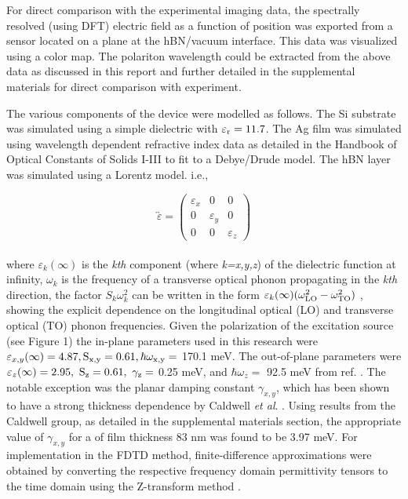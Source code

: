 \documentclass[12pt]{report}
\begin{document}
    For direct comparison with the experimental imaging data, the spectrally resolved (using DFT) electric field as a function of position was exported from a sensor located on a plane at the hBN/vacuum interface. This data was visualized using a color map. The polariton wavelength could be extracted from the above data as discussed in this report and further detailed in the supplemental materials for direct comparison with experiment.

    The various components of the device were modelled as follows. The Si substrate was simulated using a simple dielectric with $\rm \varepsilon_{r}=11.7$. The Ag film was simulated using wavelength dependent refractive index data as detailed in the Handbook of Optical Constants of Solids I-III \cite{Palik:85} to fit to a Debye/Drude model. The hBN layer was simulated using a Lorentz model. i.e.,

          \begin{equation*}
            \overleftrightarrow{\varepsilon} = \begin{pmatrix} \varepsilon_{x}&0&0\\
                                          0&\varepsilon_{y}&0\\
                                          0&0&\varepsilon_{z}\end{pmatrix}
          \end{equation*}
          \\

    where $\varepsilon_{k}(\infty)$ is the \textit{kth} component (where \textit{k=x,y,z}) of the dielectric function at infinity, $\omega_{k} $ is the frequency of a transverse optical phonon propagating in the \textit{kth} direction, the factor $S_{k} \omega_{k}^{2} $ can be written in the form $\varepsilon_{k}(\infty)(\omega_{\rm{LO}}^{2} - \omega_{\rm{TO}}^{2}) $  \cite{Kumar:15}, showing the explicit dependence on the longitudinal optical (LO) and transverse optical (TO) phonon frequencies. Given the polarization of the excitation source (see Figure 1) the in-plane parameters used in this research were $\varepsilon_{x,y}(\infty)= \rm{4.87}, S_{x,y} = \rm{0.61}, \hbar \omega_{x,y} = $ 170.1 meV. The out-of-plane parameters were  $\varepsilon_{z}(\infty)= \rm{2.95}, \ S_{z} = \rm{0.61}, \ \gamma_{z} = $ 0.25 meV, and $\hbar \omega_{z} = $ 92.5 meV from ref. \cite{Jiang:18}. The notable exception was the planar damping constant $\gamma_{x,y} $, which has been shown to have a strong thickness dependence by Caldwell \textit{et al}. \cite{Caldwell:14}. Using results from the Caldwell group, as detailed in the supplemental materials section, the appropriate value of $\gamma_{x,y} $ for a of film thickness 83 nm was found to be 3.97 meV. For implementation in the FDTD method, finite-difference approximations were obtained by converting the respective frequency domain permittivity tensors to the time domain using the Z-transform method \cite{Sullivan:96, Sakurai:17}.
    \\
\end{document}
